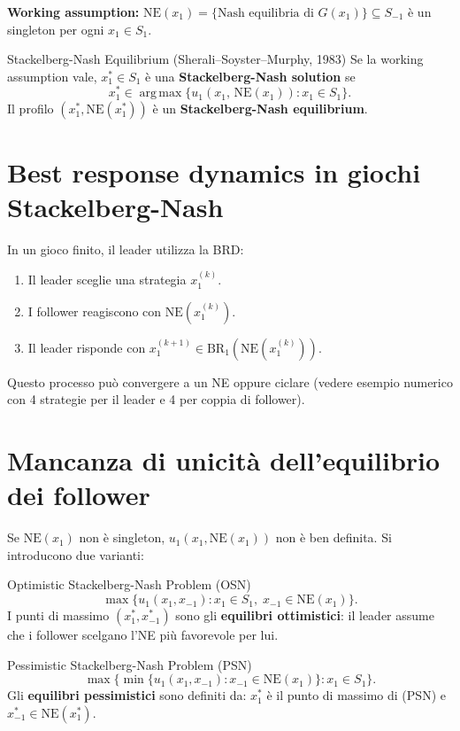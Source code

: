 \documentclass[12pt,a4paper,twoside]{book}
\theoremstyle{plain}
\theoremstyle{definition}
\newcommand{\NE}{\mathrm{NE}}
\newcommand{\BR}{\mathrm{BR}}
\newcommand{\argmax}{\operatorname*{arg\,max}}
\begin{document}
\textbf{Working assumption:} $\NE(x_1) = \{\text{Nash equilibria di }G(x_1)\}\subseteq S_{-1}$ è un singleton per ogni $x_1\in S_1$.

\begin{defbox}{Stackelberg-Nash Equilibrium (Sherali--Soyster--Murphy, 1983)}
Se la working assumption vale, $x_1^*\in S_1$ è una \textbf{Stackelberg-Nash solution} se
\[
  x_1^* \in \argmax\{u_1(x_1,\,\NE(x_1)) : x_1\in S_1\}.
\]
Il profilo $(x_1^*,\NE(x_1^*))$ è un \textbf{Stackelberg-Nash equilibrium}.
\end{defbox}

\section{Best response dynamics in giochi Stackelberg-Nash}

In un gioco finito, il leader utilizza la BRD:
\begin{enumerate}
  \item Il leader sceglie una strategia $x_1^{(k)}$.
  \item I follower reagiscono con $\NE(x_1^{(k)})$.
  \item Il leader risponde con $x_1^{(k+1)}\in\BR_1(\NE(x_1^{(k)}))$.
\end{enumerate}
Questo processo può convergere a un NE oppure ciclare (vedere esempio numerico con 4 strategie per il leader e 4 per coppia di follower).

\section{Mancanza di unicità dell'equilibrio dei follower}

Se $\NE(x_1)$ non è singleton, $u_1(x_1,\NE(x_1))$ non è ben definita. Si introducono due varianti:

\begin{defbox}{Optimistic Stackelberg-Nash Problem (OSN)}
\[
  \max\{u_1(x_1,x_{-1}) : x_1\in S_1,\; x_{-1}\in\NE(x_1)\}. \tag{OSN}
\]
I punti di massimo $(x_1^*,x_{-1}^*)$ sono gli \textbf{equilibri ottimistici}: il leader assume che i follower scelgano l'NE più favorevole per lui.
\end{defbox}

\begin{defbox}{Pessimistic Stackelberg-Nash Problem (PSN)}
\[
  \max\{\min\{u_1(x_1,x_{-1}) : x_{-1}\in\NE(x_1)\} : x_1\in S_1\}. \tag{PSN}
\]
Gli \textbf{equilibri pessimistici} sono definiti da: $x_1^*$ è il punto di massimo di (PSN) e $x_{-1}^*\in\NE(x_1^*)$.
\end{defbox}
\end{document}
